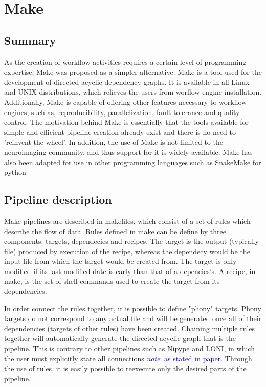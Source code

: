 \documentclass{report}
\newcommand{\note}[1]{\textcolor{blue}{\textit{note}: #1}}
\begin{document}
           \section{Make} \subsection{Summary} As the creation of workflow
           activities requires a certain level of programming expertise, Make
           was proposed as a simpler alternative. Make is a tool used for the
           development of directed acyclic dependency graphs. It is available in
           all Linux and UNIX distributions, which relieves the users from
           worflow engine installation. Additionally, Make is capable of
           offering other features necessary to workflow engines, such as,
           reproducibility, parallelization, fault-tolerance and quality
           control. The motivation behind Make is essentially that the tools
           available for simple and efficient pipeline creation already exist
           and there is no need to 'reinvent the wheel'. In addition, the use of
           Make is not limited to the neuroimaging community, and thus support
           for it is widely available. Make has also been adapted for use in
           other programming languages such as SnakeMake for python

 
        \subsection{Pipeline description} Make pipelines are described in
        makefiles, which consist of a set of rules which describe the flow of
        data. Rules defined in make can be define by three components: targets,
        dependecies and recipes. The target is the output (typically file)
        produced by execution of the recipe, whereas the dependecy would be the
        input file from which the target would be created from. The target is
        only modified if its last modified date is early than that of a
        depencies's.  A recipe, in make, is the set of shell commands used to
        create the target from its dependencies. 

In order connect the rules together, it is possible to define "phony" targets.
Phony targets do not correspond to any actual file and will be generated once
all of their dependencies (targets of other rules) have been created. Chaining
multiple rules together will automatically generate the directed acyclic graph
that is the pipeline. This is contrary to other pipelines such as Nipype and
LONI, in which the user must explicitly state all connections \note{as stated in
paper}. Through the use of rules, it is easily possible to reexecute only the
desired parts of the pipeline.
\end{document}
